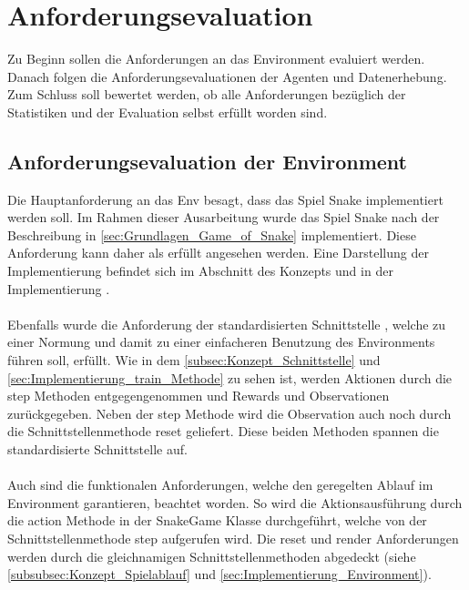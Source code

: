 \section{Anforderungsevaluation}
Zu Beginn sollen die Anforderungen an das Environment evaluiert werden. Danach folgen die Anforderungsevaluationen der Agenten und Datenerhebung. Zum Schluss soll bewertet werden, ob alle Anforderungen bezüglich der Statistiken und der Evaluation selbst erfüllt worden sind.

\subsection{Anforderungsevaluation der Environment}
Die Hauptanforderung an das Env besagt, dass das Spiel Snake implementiert werden soll. Im Rahmen dieser Ausarbeitung wurde das Spiel Snake nach der Beschreibung in \autoref{sec:Grundlagen_Game_of_Snake} implementiert. Diese Anforderung kann daher als erfüllt angesehen werden. Eine Darstellung der Implementierung befindet sich im Abschnitt des Konzepts  und in der Implementierung .\\
\\ Ebenfalls wurde die Anforderung der standardisierten Schnittstelle , welche zu einer Normung und damit zu einer einfacheren Benutzung des Environments führen soll, erfüllt. Wie in dem \autoref{subsec:Konzept_Schnittstelle} und \autoref{sec:Implementierung_train_Methode} zu sehen ist, werden Aktionen durch die step Methoden entgegengenommen und Rewards und Observationen zurückgegeben. Neben der step Methode wird die Observation auch noch durch die Schnittstellenmethode reset geliefert. Diese beiden Methoden spannen die standardisierte Schnittstelle auf.\\
\\Auch sind die funktionalen Anforderungen, welche den geregelten Ablauf im Environment garantieren, beachtet worden.
So wird die Aktionsausführung   durch die action Methode in der SnakeGame Klasse durchgeführt, welche von der Schnittstellenmethode step aufgerufen wird. Die reset und render Anforderungen werden durch die gleichnamigen Schnittstellenmethoden abgedeckt (siehe \autoref{subsubsec:Konzept_Spielablauf} und \autoref{sec:Implementierung_Environment}).


